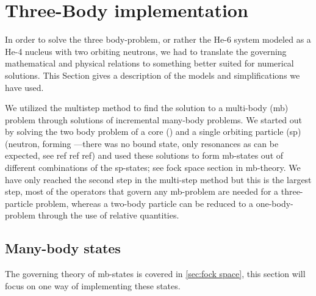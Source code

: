 \documentclass[../main/report.tex]{subfiles}
\begin{document}
\section{Three-Body implementation}
In order to solve the three body-problem, or rather the He-6 system 
modeled as a He-4 nucleus with two orbiting neutrons, we had to 
translate the governing mathematical and physical relations to 
something better suited for numerical solutions. This Section gives a description of the models and simplifications we have used.

We utilized the multistep method to find the solution to a 
multi-body (mb) problem through solutions of incremental many-body 
problems. We started out by solving the two body problem of a core 
() and a single orbiting particle (sp) (neutron, forming 
---there was no bound state, only resonances as can be expected, 
see ref ref ref) and used these solutions to form mb-states out of 
different combinations of the sp-states; see fock space section in 
mb-theory. We have only reached the second step in the multi-step 
method but this is the largest step, most of the operators that govern 
any mb-problem are needed for a three-particle problem, whereas a 
two-body particle can be reduced to a one-body-problem through the 
use of relative quantities.
 
\subsection{Many-body states}
The governing theory of mb-states is covered in \cref{sec:fock space}, this section will focus on one way of implementing these states.
\end{document}
